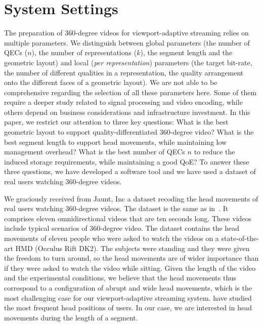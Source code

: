 \newcommand\testbitrateBudget{7}
\section{System Settings}
\label{sec:settings}

The preparation of 360-degree videos for viewport-adaptive streaming
relies on multiple parameters. We distinguish between global
parameters (the number of \acp{QEC} ($n$), the number of
representations ($k$), the segment length and the geometric layout)
and local (\emph{per representation}) parameters (the target bit-rate,
the number of different qualities in a representation, the quality
arrangement onto the different faces of a geometric layout). We are
not able to be comprehensive regarding the selection of all these
parameters here. Some of them require a deeper study related to signal
processing and video encoding, while others depend on business
considerations and infrastructure investment. In this paper, we
restrict our attention to three key questions: What is the best
geometric layout to support quality-differentiated 360-degree video?
What is the best segment length to support head movements, while
maintaining low management overhead? What is the best number of
\acp{QEC} $n$ to reduce the induced storage requirements, while
maintaining a good \ac{QoE}? To answer these three questions, we have
developed a software tool and we have used a dataset of real users
watching 360-degree videos.


We graciously received from Jaunt, Inc a dataset
recoding the head movements of real users watching 360-degree videos.
The dataset is the same as in~\cite{yu_framework_2015}. It comprises
eleven omnidirectional videos that are ten seconds long. These videos
include typical scenarios of 360-degree video. The dataset contains
the head movements of eleven people who were asked to watch the videos
on a state-of-the-art \ac{HMD} (Occulus Rift DK2). The subjects were
standing and they were given the freedom to turn around, so the head
movements are of wider importance than if they were asked to watch the
video while sitting. Given the length of the video and the
experimental conditions, we believe that the head movements thus
correspond to a configuration of abrupt and wide head movements, which
is the most challenging case for our viewport-adaptive streaming
system. \citet{yu_framework_2015} have studied the most frequent head
positions of users. In our case, we are interested in head movements
during the length of a segment.

